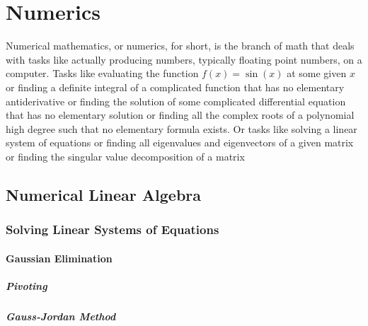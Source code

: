 \chapter{Numerics}
Numerical mathematics, or numerics, for short, is the branch of math that deals with tasks like actually producing numbers, typically floating point numbers, on a computer. Tasks like evaluating the function $f(x) = \sin(x)$ at some given $x$ or finding a definite integral of a complicated function that has no elementary antiderivative or finding the solution of some complicated differential equation that has no elementary solution or finding all the complex roots of a polynomial high degree such that no elementary formula exists. Or tasks like solving a linear system of equations or finding all eigenvalues and eigenvectors of a given matrix or finding the singular value decomposition of a matrix



\section{Numerical Linear Algebra}


\subsection{Solving Linear Systems of Equations}

\subsubsection{Gaussian Elimination}

\paragraph{Pivoting}

\paragraph{Gauss-Jordan Method}


